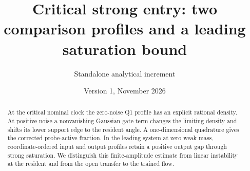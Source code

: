\documentclass[11pt]{article}
\title{Critical strong entry: two comparison profiles and a leading saturation bound}
\author{Standalone analytical increment}\date{Version 1, November 2026}
\begin{document}
\maketitle
\begin{abstract}
At the critical nominal clock the zero-noise Q1 profile has an explicit
rational density. At positive noise a nonvanishing Gaussian gate term
changes the limiting density and shifts its lower support edge to the
resident angle. A one-dimensional quadrature gives the corrected
probe-active fraction. In the leading system at zero weak mass,
coordinate-ordered input and output profiles retain a positive output
gap through strong saturation. We distinguish this finite-amplitude
estimate from linear instability at the resident and from the open
transfer to the trained flow.
\end{abstract}
\end{document}
